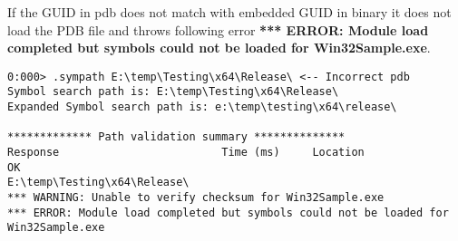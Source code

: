 \documentclass{article}
\begin{document}
If the GUID in pdb does not match with embedded GUID in binary it does not load the PDB file and throws following error \textbf{*** ERROR: Module load completed but symbols could not be loaded for Win32Sample.exe}.

\begin{verbatim}
0:000> .sympath E:\temp\Testing\x64\Release\ <-- Incorrect pdb
Symbol search path is: E:\temp\Testing\x64\Release\
Expanded Symbol search path is: e:\temp\testing\x64\release\

************* Path validation summary **************
Response                         Time (ms)     Location
OK                                             E:\temp\Testing\x64\Release\
*** WARNING: Unable to verify checksum for Win32Sample.exe
*** ERROR: Module load completed but symbols could not be loaded for Win32Sample.exe
\end{verbatim}
\end{document}
